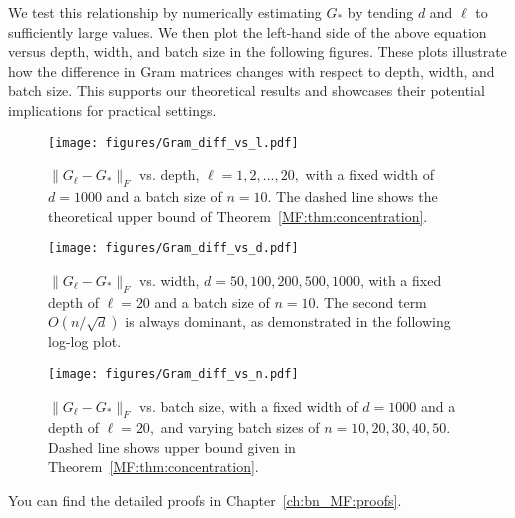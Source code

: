 We test this relationship by numerically estimating $G_*$ by tending $d$ and $\ell$ to sufficiently large values. We then plot the left-hand side of the above equation versus depth, width, and batch size in the following figures. These plots illustrate how the difference in Gram matrices changes with respect to depth, width, and batch size. This supports our theoretical results and showcases their potential implications for practical settings. 
\begin{figure}[ht]
\centering
\texttt{[image: figures/Gram\_diff\_vs\_l.pdf]}
\vspace{-.4cm}
\caption{$\|G_\ell - G_*\|_F$ vs. depth, $\ell = 1,2,...,20,$ with a fixed width of $d=1000$ and a batch size of $n=10$. The dashed line shows the theoretical upper bound of Theorem~\ref{MF:thm:concentration}.}
\label{MF:fig:Gram_vs_depth}
\end{figure}
\begin{figure}[ht]
\centering
\texttt{[image: figures/Gram\_diff\_vs\_d.pdf]}
\vspace{-.4cm}
\caption{$\|G_\ell - G_*\|_F$ vs. width, $d=50,100,200,500,1000$, with a fixed depth of $\ell=20$ and a batch size of $n=10.$ The second term $O(n/\sqrt{d})$ is always dominant, as demonstrated in the following log-log plot.}
\label{MF:fig:Gram_vs_width}
\end{figure}

\begin{figure}[ht]
\centering
\texttt{[image: figures/Gram\_diff\_vs\_n.pdf]}
\vspace{-.4cm}
\caption{$\|G_\ell - G_*\|_F$ vs. batch size, with a fixed width of $d=1000$ and a depth of $\ell=20,$ and varying batch sizes of $n=10,20,30,40,50.$ Dashed line shows upper bound given in Theorem~\ref{MF:thm:concentration}.}
\label{MF:fig:Gram_vs_n}
\end{figure}

You can find the detailed proofs in Chapter~\ref{ch:bn_MF:proofs}.



